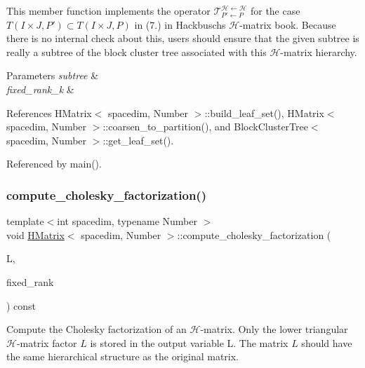 This member function implements the operator $\mathcal{T}_{P' \leftarrow P}^{\mathcal{H} \leftarrow \mathcal{H}}$ for the case $T(I \times J, P') \subset T(I \times J, P)$ in (7.) in Hackbusch\textquotesingle{}s $\mathcal{H}$-\/matrix book. Because there is no internal check about this, users should ensure that the given {\ttfamily subtree} is really a subtree of the block cluster tree associated with this $\mathcal{H}$-\/matrix hierarchy.


\begin{DoxyParams}{Parameters}
{\em subtree} & \\
\hline
{\em fixed\+\_\+rank\+\_\+k} & \\
\hline
\end{DoxyParams}


References H\+Matrix$<$ spacedim, Number $>$\+::build\+\_\+leaf\+\_\+set(), H\+Matrix$<$ spacedim, Number $>$\+::coarsen\+\_\+to\+\_\+partition(), and Block\+Cluster\+Tree$<$ spacedim, Number $>$\+::get\+\_\+leaf\+\_\+set().



Referenced by main().

\mbox{\label{classHMatrix_a7d6c76f7db2b9239f24df292e945a970}} 
\subsubsection{\texorpdfstring{compute\+\_\+cholesky\+\_\+factorization()}{compute\_cholesky\_factorization()}\hspace{0.1cm}{\footnotesize\ttfamily [1/2]}}
{\footnotesize\ttfamily template$<$int spacedim, typename Number $>$ \\
void \hyperlink{classHMatrix}{H\+Matrix}$<$ spacedim, Number $>$\+::compute\+\_\+cholesky\+\_\+factorization (\begin{DoxyParamCaption}\item[{\hyperlink{classHMatrix}{H\+Matrix}$<$ spacedim, Number $>$ \&}]{L,  }\item[{const unsigned int}]{fixed\+\_\+rank }\end{DoxyParamCaption}) const}

Compute the Cholesky factorization of an $\mathcal{H}$-\/matrix. Only the lower triangular $\mathcal{H}$-\/matrix factor $L$ is stored in the output variable {\ttfamily L}. The matrix $L$ should have the same hierarchical structure as the original matrix.


